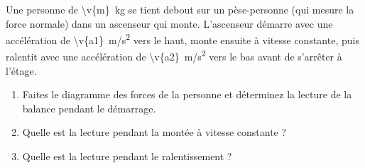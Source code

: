 Une personne de \qty{\v{m}}{kg} se tient debout sur un pèse-personne (qui mesure la force normale) dans un ascenseur qui monte. L'ascenseur démarre avec une accélération de \qty{\v{a1}}{m/s^2} vers le haut, monte ensuite à vitesse constante, puis ralentit avec une accélération de \qty{\v{a2}}{m/s^2} vers le bas avant de s'arrêter à l'étage.

\begin{enumerate}[label=\alph*)]
    \item Faites le diagramme des forces de la personne et déterminez la lecture de la balance pendant le démarrage.
    \item Quelle est la lecture pendant la montée à vitesse constante ?
    \item Quelle est la lecture pendant le ralentissement ?
\end{enumerate}
